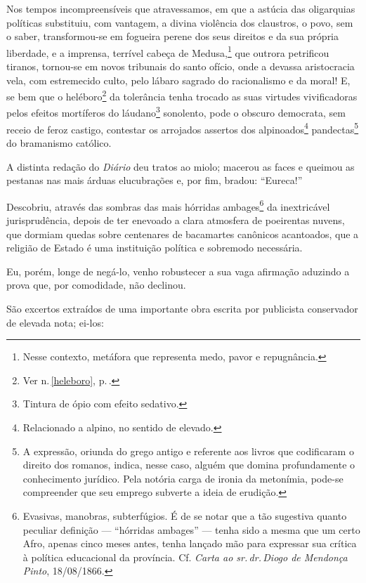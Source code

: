 Nos tempos incompreensíveis que atravessamos, em que a astúcia das
oligarquias políticas substituiu, com vantagem, a divina violência dos
claustros, o povo, sem o saber, transformou-se em fogueira perene dos
seus direitos e da sua própria liberdade, e a imprensa, terrível cabeça
de Medusa,\footnote{Nesse contexto, metáfora que representa medo,
  pavor e repugnância.} que outrora petrificou tiranos, tornou-se em
novos tribunais do santo ofício, onde a devassa aristocracia vela, com
estremecido culto, pelo lábaro sagrado do racionalismo e da moral! E, se
bem que o heléboro\footnote{Ver n.\,\ref{heleboro}, p.\,\pageref{heleboro}.} da tolerância tenha trocado as suas
virtudes vivificadoras pelos efeitos mortíferos do láudano\footnote{
  Tintura de ópio com efeito sedativo.} sonolento, pode o obscuro
democrata, sem receio de feroz castigo, contestar os arrojados assertos
dos alpinoados\footnote{Relacionado a alpino, no sentido de elevado.}
pandectas\footnote{A expressão, oriunda do grego antigo e referente
  aos livros que codificaram o direito dos romanos, indica, nesse caso,
  alguém que domina profundamente o conhecimento jurídico. Pela notória
  carga de ironia da metonímia, pode-se compreender que seu emprego
  subverte a ideia de erudição.} do bramanismo católico.

A distinta redação do \emph{Diário} deu tratos ao miolo; macerou as
faces e queimou as pestanas nas mais árduas elucubrações e, por fim,
bradou: ``Eureca!''

Descobriu, através das sombras das mais hórridas ambages\footnote{
  Evasivas, manobras, subterfúgios. É de se notar que a tão sugestiva
  quanto peculiar definição --- ``hórridas ambages'' --- tenha sido a mesma
  que um certo Afro, apenas cinco meses antes, tenha lançado mão
  para expressar sua crítica à política educacional da província. Cf.
  \emph{Carta ao sr.\,dr.\,Diogo de Mendonça Pinto}, 18/08/1866.} da
inextricável jurisprudência, depois de ter enevoado a clara atmosfera de
poeirentas nuvens, que dormiam quedas sobre centenares de bacamartes
canônicos acantoados, que a religião de Estado é uma instituição
política e sobremodo necessária.

Eu, porém, longe de negá-lo, venho robustecer a sua vaga afirmação
aduzindo a prova que, por comodidade, não declinou.

São excertos extraídos de uma importante obra escrita por publicista
conservador de elevada nota; ei-los:


